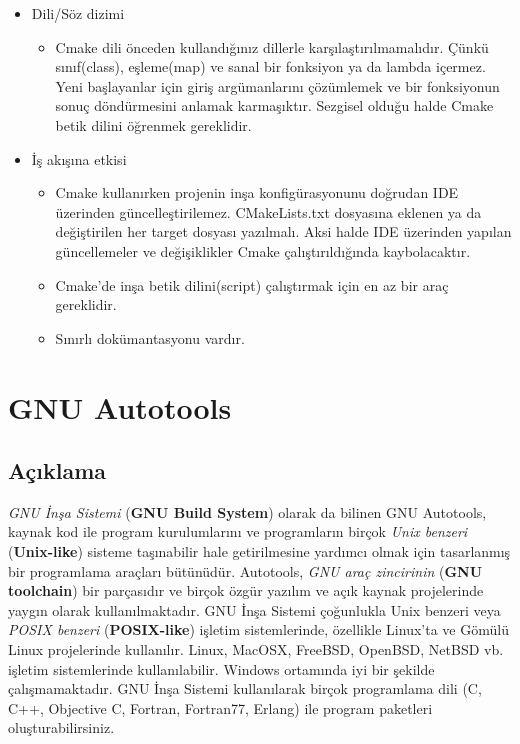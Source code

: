 \documentclass[
]{book}
\providecommand{\tightlist}{%
  \setlength{\itemsep}{0pt}\setlength{\parskip}{0pt}}
\begin{document}
\begin{itemize}
\tightlist
\item
  Dili/Söz dizimi

  \begin{itemize}
  \tightlist
  \item
    Cmake dili önceden kullandığınız dillerle karşılaştırılmamalıdır. Çünkü sınıf(class), eşleme(map) ve sanal bir fonksiyon ya da lambda içermez. Yeni başlayanlar için giriş argümanlarını çözümlemek ve bir fonksiyonun sonuç döndürmesini anlamak karmaşıktır. Sezgisel olduğu halde Cmake betik dilini öğrenmek gereklidir.
  \end{itemize}
\item
  İş akışına etkisi

  \begin{itemize}
  \tightlist
  \item
    Cmake kullanırken projenin inşa konfigürasyonunu doğrudan IDE üzerinden güncelleştirilemez. CMakeLists.txt dosyasına eklenen ya da değiştirilen her target dosyası yazılmalı. Aksi halde IDE üzerinden yapılan güncellemeler ve değişiklikler Cmake çalıştırıldığında kaybolacaktır.
  \item
    Cmake'de inşa betik dilini(script) çalıştırmak için en az bir araç gereklidir.
  \item
    Sınırlı dokümantasyonu vardır.
  \end{itemize}
\end{itemize}

\hypertarget{gnu-autotools}{%
\chapter{GNU Autotools}\label{gnu-autotools}}

\hypertarget{auxe7ux131klama}{%
\section{Açıklama}\label{auxe7ux131klama}}

\emph{GNU İnşa Sistemi} (\textbf{GNU Build System}) olarak da bilinen GNU Autotools, kaynak kod ile program kurulumlarını ve programların birçok \emph{Unix benzeri} (\textbf{Unix-like}) sisteme taşınabilir hale getirilmesine yardımcı olmak için tasarlanmış bir programlama araçları bütünüdür. Autotools, \emph{GNU araç zincirinin} (\textbf{GNU toolchain}) bir parçasıdır ve birçok özgür yazılım ve açık kaynak projelerinde yaygın olarak kullanılmaktadır. GNU İnşa Sistemi çoğunlukla Unix benzeri veya \emph{POSIX benzeri} (\textbf{POSIX-like}) işletim sistemlerinde, özellikle Linux'ta ve Gömülü Linux projelerinde kullanılır. Linux, MacOSX, FreeBSD, OpenBSD, NetBSD vb. işletim sistemlerinde kullanılabilir. Windows ortamında iyi bir şekilde çalışmamaktadır. GNU İnşa Sistemi kullanılarak birçok programlama dili (C, C++, Objective C, Fortran, Fortran77, Erlang) ile program paketleri oluşturabilirsiniz.
\end{document}
